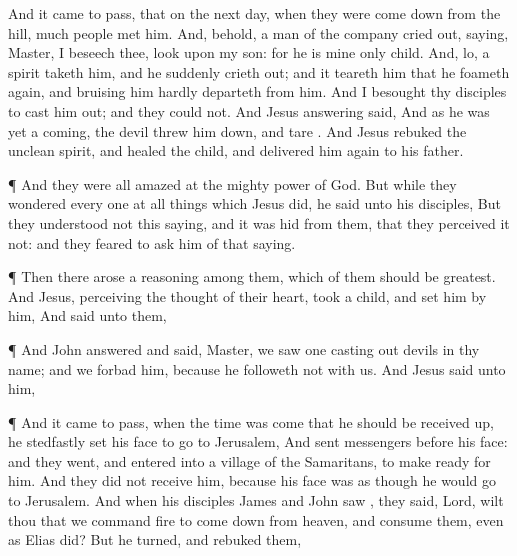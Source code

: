 {And it came to pass,
that
on
the
next
day,
when
they were come
down
from the
hill,
much
people
met
him.
And,
behold, a
man
of the
company cried
out,
saying,
Master, I
beseech
thee,
look
upon
my
son:
for he
is
mine only
child.
And,
lo, a
spirit
taketh
him,
and
he
suddenly crieth
out;
and it
teareth
him
that he foameth
again,
and
bruising
him
hardly
departeth
from
him.
And I
besought
thy
disciples
to
cast
him
out;
and they
could
not.
And
Jesus
answering
said,
{}
And
as
he
was
yet a
coming, the
devil
threw
him
down,
and
tare
{}.
And
Jesus
rebuked
the
unclean
spirit,
and
healed the
child,
and
delivered
him
again
to
his
father.
\par }{\PP {}¶
And they
were
all
amazed
at the mighty
power of
God.
But while they
wondered every
one
at all
things
which
Jesus
did, he
said
unto
his
disciples,
But they understood
not
this
saying,
and it
was
hid
from
them,
that they
perceived
it
not:
and they
feared to
ask
him
of
that
saying.
\par }{\PP {}¶
Then there
arose a
reasoning
among
them,
which of
them should
be
greatest.
And
Jesus,
perceiving the
thought
of
their
heart,
took a
child, and
set
him
by
him,
And
said unto
them,
{}
\par }{\PP {}¶
And
John
answered and
said,
Master, we
saw
one casting
out
devils
in
thy
name;
and we
forbad
him,
because he
followeth
not
with
us.
And
Jesus
said
unto
him,
{}
\par }{\PP {}¶
And it came to
pass,
when the
time was
come
that
he should be received
up,
he stedfastly
set
his
face to
go
to
Jerusalem,
And
sent
messengers
before
his
face:
and they
went, and
entered
into a
village of the
Samaritans,
to make
ready for
him.
And they
did
not
receive
him,
because
his
face
was as though he would
go
to
Jerusalem.
And
when
his
disciples
James
and
John
saw
{}, they
said,
Lord, wilt
thou that we
command
fire to come
down
from
heaven,
and
consume
them,
even
as
Elias
did?
But he
turned, and
rebuked
them,
}
